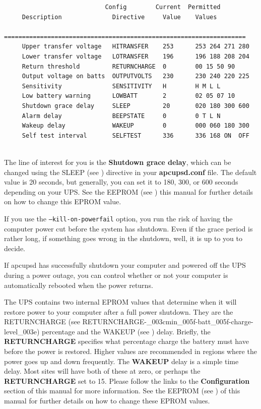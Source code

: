 {{{{{{{{{\begin{verbatim}
                            Config        Current  Permitted
     Description              Directive     Value    Values
     ===================================================================
     Upper transfer voltage   HITRANSFER    253      253 264 271 280
     Lower transfer voltage   LOTRANSFER    196      196 188 208 204
     Return threshold         RETURNCHARGE  0        00 15 50 90
     Output voltage on batts  OUTPUTVOLTS   230      230 240 220 225
     Sensitivity              SENSITIVITY   H        H M L L
     Low battery warning      LOWBATT       2        02 05 07 10
     Shutdown grace delay     SLEEP         20       020 180 300 600
     Alarm delay              BEEPSTATE     0        0 T L N
     Wakeup delay             WAKEUP        0        000 060 180 300
     Self test interval       SELFTEST      336      336 168 ON  OFF
     
\end{verbatim}
\normalsize

The line of interest for you is the {\bf Shutdown grace delay}, which can be
changed using the SLEEP (see 
) directive in your
{\bf apcupsd.conf} file. The default value is 20 seconds, but generally, you
can set it to 180, 300, or 600 seconds depending on your UPS. See the EEPROM
(see 
) this
manual for further details on how to change this EPROM value.  

If you use the \texttt{{---}kill-on-powerfail} option, you run the risk of having
the computer power cut before the system has shutdown. Even if the grace
period is rather long, if something goes wrong in the shutdown, well, it is up
to you to decide.  

If apcupsd has successfully shutdown your computer and powered off the UPS
during a power outage, you can control whether or not your computer is
automatically rebooted when the power returns.  

The UPS contains two internal EPROM values that determine when it will restore
power to your computer after a full power shutdown. They are the RETURNCHARGE
(see 
{RETURNCHARGE-_003cmin_005f-batt_005f-charge-level_003e})
percentage and the WAKEUP (see 
) delay. Briefly, the
{\bf RETURNCHARGE} specifies what percentage charge the battery must have
before the power is restored. Higher values are recommended in regions where
the power goes up and down frequently. The {\bf WAKEUP} delay is a simple time
delay. Most sites will have both of these at zero, or perhaps the {\bf
RETURNCHARGE} set to 15. Please follow the links to the {\bf Configuration}
section of this manual for more information.  See the EEPROM (see 
) of this
manual for further details on how to change these EPROM values. 

}}}}}}}}}
